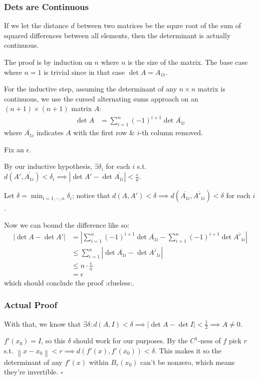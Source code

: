 \documentclass[12pt]{article}
\newcommand{\norm}[1]{\left\lVert#1\right\rVert}
\begin{document}
\subsubsection{Dets are Continuous}

If we let the distance $d$ between two matrices be the squre root of the sum
of squared differences between all elements, then the determinant is actually continuous.

The proof is by induction on $n$ where $n$ is the size of the matrix.
The base case where $n=1$ is trivial since in that case $\det A=A_{11}$.

For the inductive step, assuming the determinant of any $n \times n$ matrix is continuous,
we use the cursed alternating sums approach on an $(n+1) \times (n+1)$ matrix $A$:
\begin{align*}
  \det A
  &= \sum_{i=1}^{n} (-1)^{i+1} \det \overline{A_{1i}}
\end{align*}
where $\overline{A_{1i}}$ indicates $A$ with the first row \& $i$-th column removed.

Fix an $\epsilon$.

By our inductive hypothesis, $\exists \delta_i$ for each $i$ s.t.
$d(A', \overline{A_{1i}}) < \delta_i \implies |\det A' - \det \overline{A_{1i}}| < \frac{\epsilon}{n}$.

Let $\delta=\min_{i=1, \cdots, n} \delta_i$;
notice that $d(A, A') < \delta \implies d(\overline{A_{1i}}, \overline{A'_{1i}}) < \delta$ for each $i$.

Now we can bound the difference like so:
\begin{align*}
  |\det A - \det A'|
  &= \left|\sum_{i=1}^{n} (-1)^{i+1} \det \overline{A_{1i}} - \sum_{i=1}^{n} (-1)^{i+1} \det \overline{A'_{1i}}\right| \\
  &\le \sum_{i=1}^{n} \left|\det \overline{A_{1i}} - \det \overline{A'_{1i}}\right| \\
  &\le n \cdot \frac{\epsilon}{n} \\
  &= \epsilon
\end{align*}
which should conclude the proof :clueless:.

\subsubsection{Actual Proof}

With that, we know that $\exists \delta: d(A, I) < \delta \implies |\det A - \det I| < \frac{1}{2} \implies A \ne 0$.

$f'(x_0)=I$, so this $\delta$ should work for our purposes.
By the $C^1$-ness of $f$ pick $r$ s.t. $\norm{x-x_0} < r \implies d(f'(x), f'(x_0)) < \delta$. 
This makes it so the determinant of any $f'(x)$ within $B_r(x_0)$ can't be nonzero,
which means they're invertible. $\square$
\end{document}
